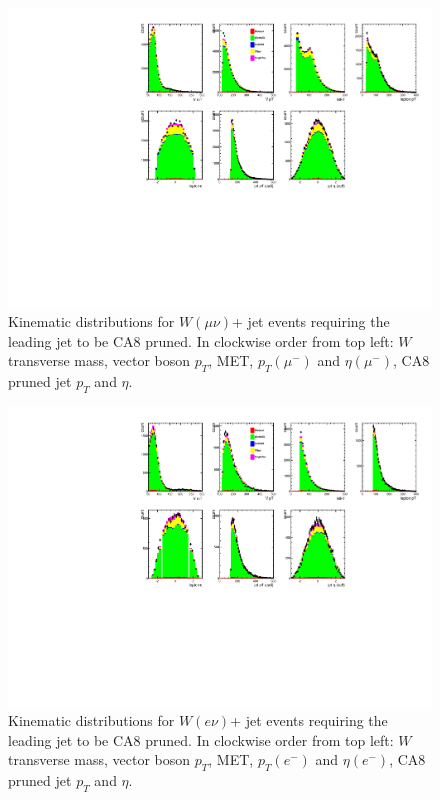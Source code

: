 \begin{figure}[htb]
\centering
\includegraphics[width=1.0\textwidth]{figs/kinematics_stack_ca8_Wmunu.pdf}
\caption{Kinematic distributions for $W(\mu\nu)$+ jet events requiring the leading jet to be CA8 pruned. In clockwise order from top left: $W$ transverse mass, vector boson $p_T$, MET, $p_T (\mu^-)$ and $\eta (\mu^-)$, CA8 pruned jet $p_T$ and $\eta$.}
\label{figs:kin3_CA8}
\end{figure}

\begin{figure}[htb]
\centering
\includegraphics[width=1.0\textwidth]{figs/kinematics_stack_ca8_Wenu.pdf}
\caption{Kinematic distributions for $W(e\nu)$+ jet events requiring the leading jet to be CA8 pruned. In clockwise order from top left: $W$ transverse mass, vector boson $p_T$, MET, $p_T (e^-)$ and $\eta (e^-)$, CA8 pruned jet $p_T$ and $\eta$.}
\label{figs:kin4_CA8}
\end{figure}

